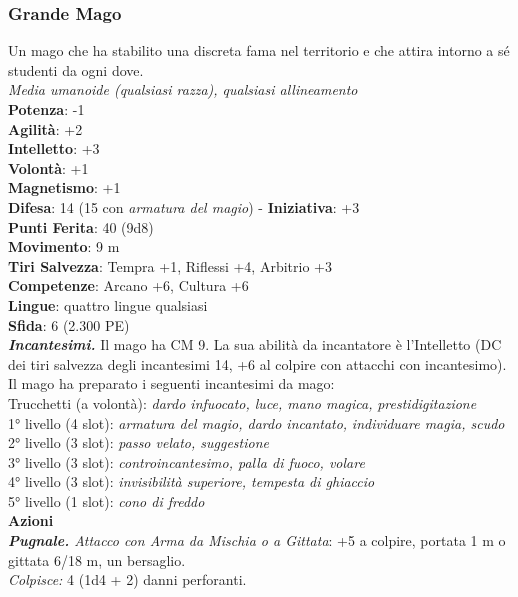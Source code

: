 \begin{multicols}{2}
\subsubsection{Grande Mago}
Un mago che ha stabilito una discreta fama nel territorio e che attira intorno a sé studenti da ogni dove.\\
\emph{Media umanoide (qualsiasi razza), qualsiasi allineamento}\\
\textbf{Potenza}: -1\\
\textbf{Agilità}: +2\\
\textbf{Intelletto}: +3\\
\textbf{Volontà}: +1\\
\textbf{Magnetismo}: +1\\
\textbf{Difesa}: 14 (15 con \emph{armatura del magio}) - \textbf{Iniziativa}: +3\\
\textbf{Punti Ferita}: 40 (9d8)\\
\textbf{Movimento}: 9 m\\
\textbf{Tiri Salvezza}: Tempra +1, Riflessi +4, Arbitrio +3 \\
\textbf{Competenze}: Arcano +6, Cultura +6\\
\textbf{Lingue}: quattro lingue qualsiasi\\
\textbf{Sfida}: 6 (2.300 PE)\smallskip\\
\emph{\textbf{Incantesimi.}} Il mago ha CM 9. La sua abilità da incantatore è l'Intelletto (DC dei tiri salvezza degli incantesimi 14, +6 al colpire con attacchi con incantesimo). Il mago ha preparato i seguenti incantesimi da mago:\\
Trucchetti (a volontà): \emph{dardo infuocato, luce, mano magica,} \emph{prestidigitazione}\\
1° livello (4 slot): \emph{armatura del magio, dardo incantato,} \emph{individuare magia, scudo}\\
2° livello (3 slot): \emph{passo velato, suggestione}\\
3° livello (3 slot): \emph{controincantesimo, palla di fuoco, volare}\\
4° livello (3 slot): \emph{invisibilità superiore, tempesta di ghiaccio}\\
5° livello (1 slot): \emph{cono di freddo}\\
\smallskip\textbf{Azioni}\\
\emph{\textbf{Pugnale.} Attacco con Arma da Mischia o a Gittata}: +5 a colpire, portata 1 m o gittata 6/18 m, un bersaglio.\\
\emph{Colpisce:} 4 (1d4 + 2) danni perforanti.


\end{multicols}
